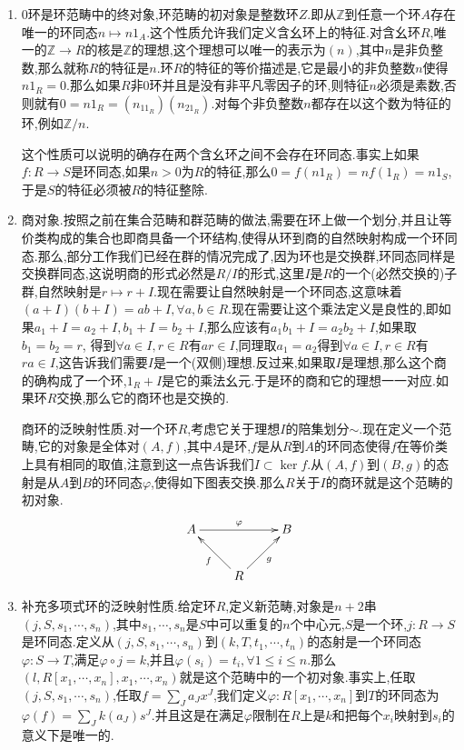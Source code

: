 \begin{enumerate}
	\item 0环是环范畴中的终对象,环范畴的初对象是整数环$Z$.即从$\mathbb{Z}$到任意一个环$A$存在唯一的环同态$n\mapsto n1_A$.这个性质允许我们定义含幺环上的特征.对含幺环$R$,唯一的$\mathbb{Z}\to R$的核是$\mathbb{Z}$的理想,这个理想可以唯一的表示为$(n)$,其中$n$是非负整数,那么就称$R$的特征是$n$.环$R$的特征的等价描述是,它是最小的非负整数$n$使得$n1_R=0$.那么如果$R$非0环并且是没有非平凡零因子的环,则特征$n$必须是素数,否则就有$0=n1_R=(n_11_R)(n_21_R)$.对每个非负整数$n$都存在以这个数为特征的环,例如$\mathbb{Z}/n$.
	
	这个性质可以说明的确存在两个含幺环之间不会存在环同态.事实上如果$f:R\to S$是环同态,如果$n>0$为$R$的特征,那么$0=f(n1_R)=nf(1_R)=n1_S$,于是$S$的特征必须被$R$的特征整除.
	
	\item 商对象.按照之前在集合范畴和群范畴的做法,需要在环上做一个划分,并且让等价类构成的集合也即商具备一个环结构,使得从环到商的自然映射构成一个环同态.那么,部分工作我们已经在群的情况完成了,因为环也是交换群,环同态同样是交换群同态,这说明商的形式必然是$R/I$的形式,这里$I$是$R$的一个(必然交换的)子群,自然映射是$r\mapsto r+I$.现在需要让自然映射是一个环同态,这意味着$(a+I)(b+I)=ab+I,\forall a,b\in R$.现在需要让这个乘法定义是良性的,即如果$a_1+I=a_2+I,b_1+I=b_2+I$,那么应该有$a_1b_1+I=a_2b_2+I$,如果取$b_1=b_2=r$, 得到$\forall a\in I,r\in R$有$ar\in I$,同理取$a_1=a_2$得到$\forall a\in I,r\in R$有$ra\in I$,这告诉我们需要$I$是一个(双侧)理想.反过来,如果取$I$是理想,那么这个商的确构成了一个环,$1_R+I$是它的乘法幺元.于是环的商和它的理想一一对应.如果环$R$交换,那么它的商环也是交换的.
	
	商环的泛映射性质.对一个环$R$,考虑它关于理想$I$的陪集划分$\sim$.现在定义一个范畴,它的对象是全体对$(A,f)$,其中$A$是环,$f$是从$R$到$A$的环同态使得$f$在等价类上具有相同的取值,注意到这一点告诉我们$I\subset\ker f$.从$(A,f)$到$(B,g)$的态射是从$A$到$B$的环同态$\varphi$,使得如下图表交换.那么$R$关于$I$的商环就是这个范畴的初对象.
	$$\xymatrix{
		A\ar[rr]^{\varphi}&&B\\
		&R\ar[ul]^{f}\ar[ur]_{g}&
	}$$
	\item 补充多项式环的泛映射性质.给定环$R$,定义新范畴,对象是$n+2$串$(j,S,s_1,\cdots,s_n)$,其中$s_1,\cdots,s_n$是$S$中可以重复的$n$个中心元,$S$是一个环,$j:R\to S$是环同态.定义从$(j,S,s_1,\cdots,s_n)$到$(k,T,t_1,\cdots,t_n)$的态射是一个环同态$\varphi:S\to T$,满足$\varphi\circ j=k$,并且$\varphi(s_i)=t_i,\forall 1\le i\le n$.那么$(l,R[x_1,\cdots,x_n],x_1,\cdots,x_n)$就是这个范畴中的一个初对象.事实上,任取$(j,S,s_1,\cdots,s_n)$,任取$f=\sum_J a_Jx^J$,我们定义$\varphi:R[x_1,\cdots,x_n]$到$T$的环同态为$\varphi(f)=\sum_J k(a_J)s^J$.并且这是在满足$\varphi$限制在$R$上是$k$和把每个$x_i$映射到$s_i$的意义下是唯一的.
	

\end{enumerate}
